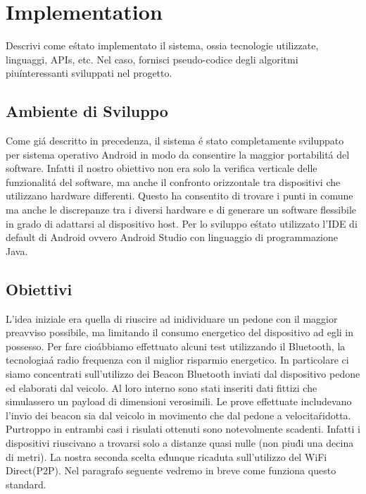 \documentclass[conference]{IEEEtran}
\begin{document}
\section{Implementation}
Descrivi come e\' stato implementato il sistema, ossia tecnologie utilizzate, linguaggi, APIs, etc. Nel caso, fornisci pseudo-codice degli algoritmi
piu\' interessanti sviluppati nel progetto.

\subsection{Ambiente di Sviluppo}
Come gi\'a descritto in precedenza, il sistema \'e stato completamente sviluppato per sistema operativo Android in modo da consentire la maggior portabilit\'a del software.
Infatti il nostro obiettivo non era solo la verifica verticale delle funzionalit\'a del software, ma anche il confronto orizzontale tra dispositivi che utilizzano hardware differenti. Questo ha consentito di trovare i punti in comune ma anche le discrepanze tra i diversi hardware e di generare un software flessibile in grado di adattarsi al dispositivo host.
Per lo sviluppo e\' stato utilizzato l'IDE di default di Android ovvero Android Studio con linguaggio di programmazione Java.


\subsection{Obiettivi}
L'idea iniziale era quella di riuscire ad inidividuare un pedone con il maggior preavviso possibile, ma limitando il consumo energetico del dispositivo ad egli in possesso.
Per fare cio\' abbiamo effettuato alcuni test utilizzando il Bluetooth, la tecnologia\' a radio frequenza con il miglior risparmio energetico. In particolare ci siamo concentrati sull'utilizzo dei Beacon Bluetooth inviati dal dispositivo pedone ed elaborati dal veicolo.
Al loro interno sono stati inseriti dati fittizi che simulassero un payload di dimensioni verosimili.
Le prove effettuate includevano l'invio dei beacon sia dal veicolo in movimento che dal pedone a velocita\' ridotta.
Purtroppo in entrambi casi i risulati ottenuti sono notevolmente scadenti. Infatti i dispositivi riuscivano a trovarsi solo a distanze quasi nulle (non piu\' di una decina di metri).
La nostra seconda scelta e\' dunque ricaduta sull'utilizzo del WiFi Direct(P2P). Nel paragrafo seguente vedremo in breve come funziona questo standard.
\end{document}
